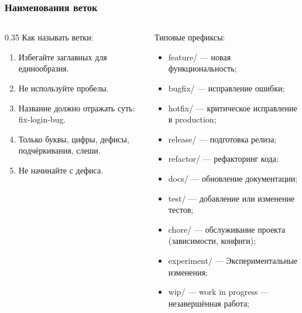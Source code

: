 \documentclass[9pt, aspectratio=1610]{beamer}
\begin{document}
\begin{frame}\frametitle{Наименования веток}
	
	
	 
	\begin{columns}[]
		\edef\colA{0.35}
		\begin{column}[t]{\colA\linewidth}
			Как называть ветки:
			
			\begin{enumerate}
				\item Избегайте заглавных для единообразия.
				\item Не используйте пробелы.
				\item Название должно отражать суть:   fix-login-bug.
				\item Только буквы, цифры, дефисы, подчёркивания, слеши.
				\item Не начинайте с дефиса.
			\end{enumerate}
		\end{column}
		\begin{column}[t]{\fpeval{1-\colA}\linewidth}
			Типовые префиксы:
			\begin{itemize}
				\item feature/ ---	новая функциональность;	
				\item bugfix/ ---	исправление ошибки;	
				\item hotfix/ ---	критическое исправление в production;
				\item release/ ---	подготовка релиза;	
				\item refactor/	--- рефакторинг кода;	
				\item docs/ ---	обновление документации;	
				\item test/	--- добавление или изменение тестов;
				\item chore/ --- обслуживание проекта (зависимости, конфиги);	
				\item experiment/ --- Экспериментальные изменения;	
				\item wip/ --- work in progress — незавершённая работа;
			\end{itemize}
				
		\end{column}
	\end{columns}
	

	
\end{frame}
\end{document}
